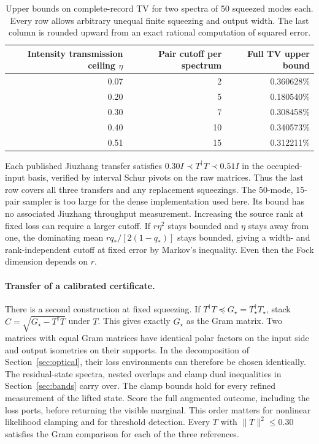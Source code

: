 \documentclass[11pt]{article}
\begin{document}
\begin{table}[ht]\centering\small
\caption{Upper bounds on complete-record TV for two spectra of 50 squeezed modes each. Every row allows arbitrary unequal finite squeezing and output width. The last column is rounded upward from an exact rational computation of squared error.}
\begin{tabular}{rrr}\toprule
Intensity transmission ceiling $\eta$ & Pair cutoff per spectrum & Full TV upper bound\\\midrule
0.07 & 2 & 0.360628\%\\
0.20 & 5 & 0.180540\%\\
0.30 & 7 & 0.308458\%\\
0.40 & 10 & 0.340573\%\\
0.51 & 15 & 0.312211\%\\\bottomrule
\end{tabular}\label{tab:family}
\end{table}
Each published Jiuzhang transfer satisfies $0.30I\prec T^\dagger T\prec0.51I$ in the occupied-input basis, verified by interval Schur pivots on the raw matrices. Thus the last row covers all three transfers and any replacement squeezings. The 50-mode, 15-pair sampler is too large for the dense implementation used here. Its bound has no associated Jiuzhang throughput measurement. Increasing the source rank at fixed loss can require a larger cutoff. If $r\eta^2$ stays bounded and $\eta$ stays away from one, the dominating mean $rq_*/[2(1-q_*)]$ stays bounded, giving a width- and rank-independent cutoff at fixed error by Markov's inequality. Even then the Fock dimension depends on $r$.

\paragraph{Transfer of a calibrated certificate.}
There is a second construction at fixed squeezing. If $T^\dagger T\preceq G_\star=T_\star^\dagger T_\star$, stack $C=\sqrt{G_\star-T^\dagger T}$ under $T$. This gives exactly $G_\star$ as the Gram matrix. Two matrices with equal Gram matrices have identical polar factors on the input side and output isometries on their supports. In the decomposition of Section~\ref{sec:optical}, their loss environments can therefore be chosen identically. The residual-state spectra, nested overlaps and clamp dual inequalities in Section~\ref{sec:bands} carry over. The clamp bounds hold for every refined measurement of the lifted state. Score the full augmented outcome, including the loss ports, before returning the visible marginal. This order matters for nonlinear likelihood clamping and for threshold detection. Every $T$ with $\|T\|^2\le0.30$ satisfies the Gram comparison for each of the three references.
\end{document}
